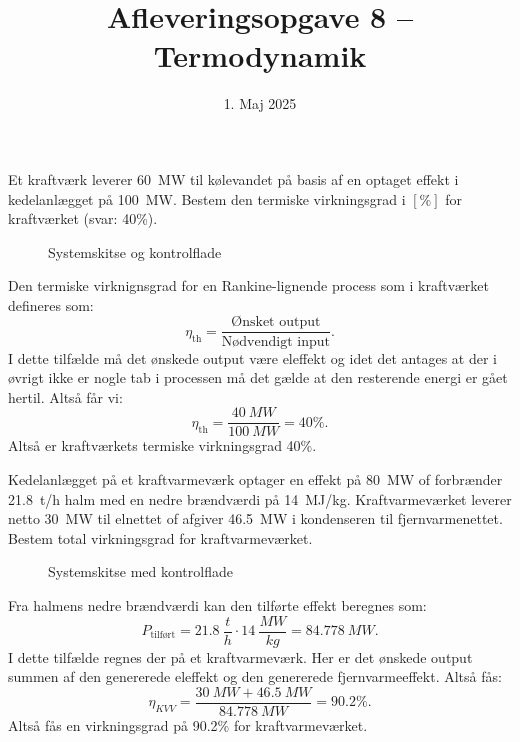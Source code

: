 \documentclass[a4paper]{article}
\title{Afleveringsopgave 8 – Termodynamik}
\date{1. Maj 2025}
\begin{document}
\maketitle

Et kraftværk leverer \qty{60}{MW} til kølevandet på basis af en optaget effekt i kedelanlægget på \qty{100}{MW}. Bestem den termiske virkningsgrad i $[\%]$ for kraftværket (svar: 40\%).
\begin{figure}[ht]
    \centering
    \caption{Systemskitse og kontrolflade}
    \label{fig:a8f1}
\end{figure}
Den termiske virknignsgrad for en Rankine-lignende process som i kraftværket defineres som:
\[ 
\eta_{\mathrm{th}} = \frac{\text{Ønsket output}}{\text{Nødvendigt input}}
.\]
I dette tilfælde må det ønskede output være eleffekt og idet det antages at der i øvrigt ikke er nogle tab i processen må det gælde at den resterende energi er gået hertil. Altså får vi:
\[ 
\eta_{\mathrm{th}} = \frac{\qty{40}{MW} }{\qty{100}{MW} } = 40\%
.\]
Altså er kraftværkets termiske virkningsgrad 40\%.


Kedelanlægget på et kraftvarmeværk optager en effekt på \qty{80}{MW} of forbrænder \qty{21,8}{t/h} halm med en nedre brændværdi på \qty{14}{MJ/kg}. Kraftvarmeværket leverer netto \qty{30}{MW} til elnettet of afgiver \qty{46,5}{MW} i kondenseren til fjernvarmenettet. Bestem total virkningsgrad for kraftvarmeværket.
\begin{figure}[ht]
    \centering
    \caption{Systemskitse med kontrolflade}
    \label{fig:a8f2}
\end{figure}
Fra halmens nedre brændværdi kan den tilførte effekt beregnes som:
\[ 
P_{\text{tilført}} = \qty{21,8}{\frac{t}{h}} \cdot \qty{14}{\frac{MW}{kg}} = \qty{84,778}{MW} 
.\]
I dette tilfælde regnes  der på et kraftvarmeværk. Her er det ønskede output summen af den genererede eleffekt og den genererede fjernvarmeeffekt. Altså fås:
\[ 
\eta_{KVV} = \frac{\qty{30}{MW} + \qty{46,5}{MW} }{\qty{84,778}{MW} } = \num{90,2}\%
.\]
Altså fås en virkningsgrad på \num{90,2}\% for kraftvarmeværket.
\end{document}
